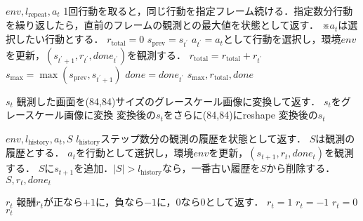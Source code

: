 \documentclass{jarticle}
\begin{document}
\begin{algorithm}[tb]
\caption{$step_{\mathrm{repeat}}(a_t)$}
\label{alg:max_and_skip}                          
\begin{algorithmic}[1]   
\REQUIRE $env, l_{\mathrm{repeat}}, a_t$
\STATE 1回行動を取ると，同じ行動を指定フレーム続ける．指定数分行動を繰り返したら，直前のフレームの観測との最大値を状態として返す．
\STATE ※$a_t$は選択したい行動とする．
\STATE $r_{\mathrm{total}}=0$
\STATE $s_{\mathrm{prev}}=s_{t^{\prime}}$
\STATE $a_{t^{\prime}}=a_t$として行動を選択し，環境$env$を更新，$(s_{t^{\prime}+1},r_{t^{\prime}}, done_{t^{\prime}})$を観測する．
\STATE $r_{\mathrm{total}}=r_{\mathrm{total}}+r_{t^{\prime}}$
\STATE $s_{\mathrm{max}}=\max(s_{\mathrm{prev}}, s_{t^{\prime}+1})$
\STATE $done=done_{t^{\prime}}$
\ENDFOR
\ENSURE $s_{\mathrm{max}}, r_{\mathrm{total}}, done$
\end{algorithmic}
\end{algorithm}

\begin{algorithm}[tb]
\caption{$observe_{\mathrm{gray84}}()$}
\label{alg:process_frame84}                          
\begin{algorithmic}[1]   
\REQUIRE $s_t$
\STATE 観測した画面を(84,84)サイズのグレースケール画像に変換して返す．
\STATE $s_t$をグレースケール画像に変換
\STATE 変換後の$s_t$をさらに(84,84)にreshape
\ENSURE 変換後の$s_t$
\end{algorithmic}
\end{algorithm}

\begin{algorithm}[tb]
\caption{$step_{\mathrm{stack}}(a_t)$}
\label{alg:frame_stack}                          
\begin{algorithmic}[1]   
\REQUIRE $env, l_{\mathrm{history}}, a_t, S$
\STATE $l_{\mathrm{history}}$ステップ数分の観測の履歴を状態として返す．
\STATE $S$は観測の履歴とする．
\STATE $a_t$を行動として選択し，環境$env$を更新，$(s_{t+1},r_t, done_t)$を観測する．
\STATE $S$に$s_{t+1}$を追加．$|S|>l_{\mathrm{history}}$なら，一番古い履歴を$S$から削除する．
\ENSURE $S, r_t, done_t$
\end{algorithmic}
\end{algorithm}

\begin{algorithm}[tb]
\caption{$reward_{\mathrm{clip}}()$}
\label{alg:clipped_reward_wrapper}                          
\begin{algorithmic}[1]   
\REQUIRE $r_t$
\STATE 報酬$r_t$が正なら$+1$に，負なら$-1$に，$0$なら$0$として返す．
\STATE $r_t=1$
\STATE $r_t=-1$
\ELSE
\STATE $r_t=0$
\ENDIF
\ENSURE $r_t$
\end{algorithmic}
\end{algorithm}
\end{document}
